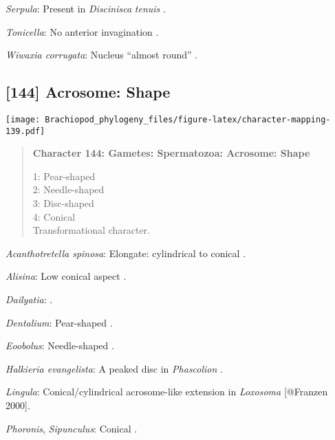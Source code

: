 \documentclass[openany]{book}
\theoremstyle{definition}
\theoremstyle{definition}
\theoremstyle{definition}
\theoremstyle{remark}
\begin{document}
\hypertarget{Serpula-coding-143}{}
\emph{Serpula}: Present in \emph{Discinisca} \emph{tenuis}
\citep{Hodgson1994Ultrastructureof}.

\hypertarget{Tonicella-coding-143}{}
\emph{Tonicella}: No anterior invagination
\citep{Hodgson1994Ultrastructureof}.

\hypertarget{Wiwaxia_corrugata-coding-143}{}
\emph{Wiwaxia corrugata}: Nucleus ``almost round''
\citep{Reunov2004Ultrastructuralstudy}.

\subsection*{{[}144{]} Acrosome: Shape}\label{acrosome-shape}

\texttt{[image: Brachiopod\_phylogeny\_files/figure-latex/character-mapping-139.pdf]}

\begin{quote}
\textbf{Character 144: Gametes: Spermatozoa: Acrosome: Shape}

1: Pear-shaped\\
2: Needle-shaped\\
3: Disc-shaped\\
4: Conical\\
Transformational character.
\end{quote}

\hypertarget{Acanthotretella_spinosa-coding-144}{}
\emph{Acanthotretella spinosa}: Elongate: cylindrical to conical
\citep{BucklandNicks1988}.

\hypertarget{Alisina-coding-144}{}
\emph{Alisina}: Low conical aspect \citep{DufresneDube1983}.

\hypertarget{Dailyatia-coding-144}{}
\emph{Dailyatia}: \citet{Gherardi2011}.

\hypertarget{Dentalium-coding-144}{}
\emph{Dentalium}: Pear-shaped \citep{Fukumoto2003Theacrosome}.

\hypertarget{Eoobolus-coding-144}{}
\emph{Eoobolus}: Needle-shaped \citep{Afzelius1978Finestructure}.

\hypertarget{Halkieria_evangelista-coding-144}{}
\emph{Halkieria evangelista}: A peaked disc in \emph{Phascolion}
\citep{Rice1993}.

\hypertarget{Lingula-coding-144}{}
\emph{Lingula}: Conical/cylindrical acrosome-like extension in
\emph{Loxosoma} {[}@Franzen 2000{]}.

\hypertarget{Phoronis-coding-144}{}
\emph{Phoronis}, \emph{Sipunculus}: Conical \citep[in
\emph{Tubulipora};][]{Franzen1984}.
\end{document}
